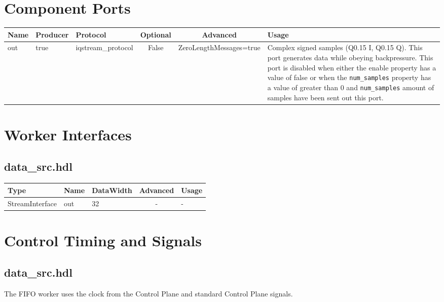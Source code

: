 \documentclass{article}
\def\comp{data\_src}
\begin{document}
\begin{landscape}
	\section*{Component Ports}
	\begin{scriptsize}
\begin{tabular}{|M{2cm}|M{1.5cm}|M{4cm}|c|c|M{9cm}|}
\hline
{}
Name & Producer & Protocol & Optional & Advanced & Usage
\\
\hline
out & true & iqstream\_protocol& False & ZeroLengthMessages=true & Complex signed samples (Q0.15 I, Q0.15 Q). This port generates data while obeying backpressure. This port is disabled when either the enable property has a value of false or when the \verb+num_samples+ property has a value of greater than 0 and \verb+num_samples+ amount of samples have been sent out this port.\\
\hline
\end{tabular}
	\end{scriptsize}

	\section*{Worker Interfaces}
	\subsection*{\comp.hdl}
	\begin{scriptsize}
\begin{tabular}{|M{2cm}|M{1.5cm}|M{4cm}|c|M{12cm}|}
\hline
{}
Type & Name & DataWidth & Advanced & Usage
\\
\hline
StreamInterface & out & 32 & - & -\\
\hline
\end{tabular}
	\end{scriptsize}
\end{landscape}

\section*{Control Timing and Signals}
\subsection*{\comp.hdl}
\begin{flushleft}
  The FIFO worker uses the clock from the Control Plane and standard Control Plane signals.
\end{flushleft}
\end{document}
